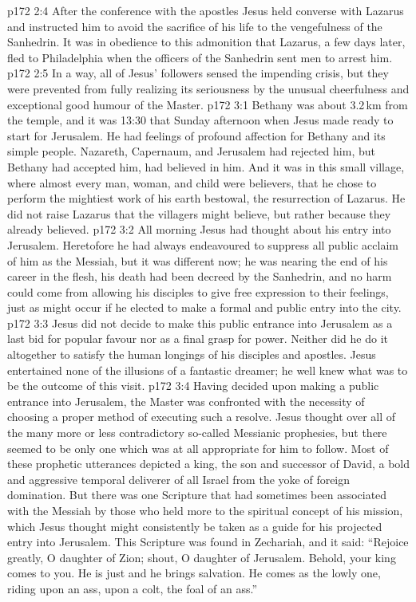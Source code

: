 \vs p172 2:4 After the conference with the apostles Jesus held converse with Lazarus and instructed him to avoid the sacrifice of his life to the vengefulness of the Sanhedrin. It was in obedience to this admonition that Lazarus, a few days later, fled to Philadelphia when the officers of the Sanhedrin sent men to arrest him.
\vs p172 2:5 In a way, all of Jesus’ followers sensed the impending crisis, but they were prevented from fully realizing its seriousness by the unusual cheerfulness and exceptional good humour of the Master.
\vs p172 3:1 Bethany was about 3.2\,km from the temple, and it was 13:30 that Sunday afternoon when Jesus made ready to start for Jerusalem. He had feelings of profound affection for Bethany and its simple people. Nazareth, Capernaum, and Jerusalem had rejected him, but Bethany had accepted him, had believed in him. And it was in this small village, where almost every man, woman, and child were believers, that he chose to perform the mightiest work of his earth bestowal, the resurrection of Lazarus. He did not raise Lazarus that the villagers might believe, but rather because they already believed.
\vs p172 3:2 All morning Jesus had thought about his entry into Jerusalem. Heretofore he had always endeavoured to suppress all public acclaim of him as the Messiah, but it was different now; he was nearing the end of his career in the flesh, his death had been decreed by the Sanhedrin, and no harm could come from allowing his disciples to give free expression to their feelings, just as might occur if he elected to make a formal and public entry into the city.
\vs p172 3:3 Jesus did not decide to make this public entrance into Jerusalem as a last bid for popular favour nor as a final grasp for power. Neither did he do it altogether to satisfy the human longings of his disciples and apostles. Jesus entertained none of the illusions of a fantastic dreamer; he well knew what was to be the outcome of this visit.
\vs p172 3:4 Having decided upon making a public entrance into Jerusalem, the Master was confronted with the necessity of choosing a proper method of executing such a resolve. Jesus thought over all of the many more or less contradictory so\hyp{}called Messianic prophesies, but there seemed to be only one which was at all appropriate for him to follow. Most of these prophetic utterances depicted a king, the son and successor of David, a bold and aggressive temporal deliverer of all Israel from the yoke of foreign domination. But there was one Scripture that had sometimes been associated with the Messiah by those who held more to the spiritual concept of his mission, which Jesus thought might consistently be taken as a guide for his projected entry into Jerusalem. This Scripture was found in Zechariah, and it said: “Rejoice greatly, O daughter of Zion; shout, O daughter of Jerusalem. Behold, your king comes to you. He is just and he brings salvation. He comes as the lowly one, riding upon an ass, upon a colt, the foal of an ass.”
